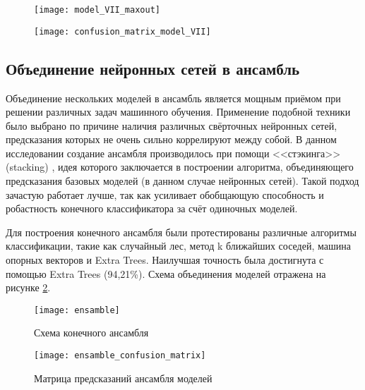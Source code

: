 \begin{figure}[H]
\centering
\begin{minipage}{.5\textwidth}
  \centering
  \vspace*{0.7cm}
  \texttt{[image: model\_VII\_maxout]}
  \vspace*{-0.4cm}
  \label{fig:model_VII_maxout}
\end{minipage}%
\begin{minipage}{.5\textwidth}
  \centering
  \texttt{[image: confusion\_matrix\_model\_VII]}
  \vspace*{-1.7cm}
  \label{fig:confusion_matrix_model_VII}
\end{minipage}
\end{figure}

\subsection{Объединение нейронных сетей в ансамбль}
Объединение нескольких моделей в ансамбль является мощным приёмом при решении различных задач машинного обучения.
Применение подобной техники было выбрано по причине наличия различных свёрточных нейронных сетей, предсказания которых
не очень сильно коррелируют между собой. В данном исследовании создание ансамбля производилось при помощи <<стэкинга>> (stacking)
\cite{Wolpert92stackedgeneralization}, идея которого заключается в построении алгоритма, объединяющего
предсказания базовых моделей (в данном случае нейронных сетей). Такой подход зачастую работает лучше, 
так как усиливает обобщающую способность и робастность конечного классификатора за счёт одиночных моделей.

Для построения конечного ансамбля были протестированы различные алгоритмы классификации, такие как случайный лес,
метод k ближайших соседей, машина опорных векторов и Extra Trees.
Наилучшая точность была достигнута с помощью Extra Trees \cite{ExtraTrees} (94,21\%).
Схема объединения моделей отражена на рисунке \ref{fig:ansamble}.

\begin{figure}[H]
    \centering
    \texttt{[image: ensamble]}
    \caption{Схема конечного ансамбля}
    \label{fig:ansamble}
\end{figure}

\begin{figure}[H]
    \centering
    \texttt{[image: ensamble\_confusion\_matrix]}
    \vspace*{-1.3cm}
    \caption{Матрица предсказаний ансамбля моделей}
    \label{fig:ensamble_confusion_matrix}
\end{figure}